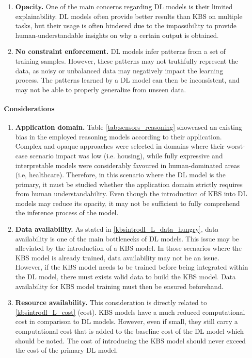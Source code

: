 \begin{enumerate} [start=1,label={\bfseries L\arabic*.}]
    \item \label{kbsintrodl_L_opacity} \textbf{Opacity.} One of the main concerns regarding DL models is their limited explainability. DL models often provide better results than KBS on multiple tasks, but their usage is often hindered due to the impossibility to provide human-understandable insights on why a certain output is obtained.
    
    \item \label{kbsintrodl_L_constraint} \textbf{No constraint enforcement.} DL models infer patterns from a set of training samples. However, these patterns may not truthfully represent the data, as noisy or unbalanced data may negatively impact the learning process. The patterns learned by a DL model can then be inconsistent, and may not be able to properly generalize from unseen data.
    \end{enumerate}
\paragraph{Considerations}
\begin{enumerate} [start=1,label={\bfseries C\arabic*.}]
    \item \label{kbsintrodl_C_domain} \textbf{Application domain.} Table \ref{tab:sensors_reasoning} showcased an existing bias in the employed reasoning models according to their application. Complex and opaque approaches were selected in domains where their worst-case scenario impact was low (i.e. housing), while fully expressive and interpretable models were considerably favoured in human-dominated areas (i.e, healthcare). Therefore, in this scenario where the DL model is the primary, it must be studied whether the application domain strictly requires from human understandability. Even though the introduction of KBS into DL models may reduce its opacity, it may not be sufficient to fully comprehend the inference process of the model. 
    
    \item  \label{kbsintrodl_C_data} \textbf{Data availability.} As stated in \ref{kbsintrodl_L_data_hungry}, data availability is one of the main bottlenecks of DL models. This issue may be alleviated by the introduction of a KBS model. In those scenarios where the KBS model is already trained, data availability may not be an issue. However, if the KBS model needs to be trained before being integrated within the DL model, there must exists valid data to build the KBS model. Data availability for KBS model training must then be ensured beforehand.
    
    \item  \label{kbsintrodl_C_resource} \textbf{Resource availability.} This consideration is directly related to \ref{kbsintrodl_L_cost} (cost). KBS models have a much reduced computational cost in comparison to DL models. However, even if small, they still carry a computational cost that is added to the baseline cost of the DL model which should be noted. The cost of introducing the KBS model should never exceed the cost of the primary DL model.
    
\end{enumerate}
